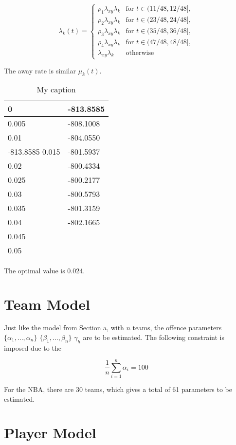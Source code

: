 \begin{equation}
    \lambda_k(t) = 
    \begin{cases}
        \rho_{1}\lambda_{xy}\lambda_{k} & \text{for }t \in (11/48, 12/48],\\
        \rho_{2}\lambda_{xy}\lambda_{k} & \text{for }t \in (23/48, 24/48],\\
        \rho_{3}\lambda_{xy}\lambda_{k} & \text{for }t \in (35/48, 36/48],\\
        \rho_{4}\lambda_{xy}\lambda_{k} & \text{for }t \in (47/48, 48/48],\\
        \lambda_{xy}\lambda_{k} & \text{otherwise}
\end{cases}
\end{equation}

The away rate is similar $\mu_k(t)$.

\begin{table}[h]
\centering
\caption{My caption}
\label{my-label}
\begin{tabular}{|l|l|}
\hline
0     & -813.8585 \\ \hline
0.005 & -808.1008 \\ \hline
0.01 & -804.0550\\ \hline-813.8585
0.015 & -801.5937\\ \hline
0.02 & -800.4334\\ \hline
0.025 & -800.2177\\ \hline
0.03 & -800.5793 \\ \hline
0.035 & -801.3159 \\ \hline
0.04 & -802.1665 \\ \hline
0.045 & \\ \hline
0.05 & \\ \hline

\end{tabular}
\end{table}

The optimal value is 0.024.

\section{Team Model}

Just like the model from Section a, with $n$ teams, the offence parameters $\{\alpha_1,\ldots,\alpha_n\}$ $\{\beta_1,\ldots,\beta_n\}$ $\gamma_h$ are to be estimated.  The following constraint is imposed due to the 

$$\frac{1}{n}\sum^{n}_{i=1}\alpha_i = 100$$

For the NBA, there are 30 teams, which gives a total of 61 parameters to be estimated.

\section{Player Model}